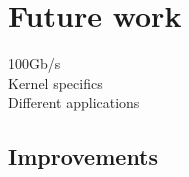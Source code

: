 \chapter{Future work}\label{ch:futurework}

100Gb/s \\
Kernel specifics \\
Different applications \\

\section{Improvements}\label{sec:improvements}


